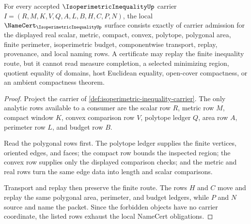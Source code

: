 \begin{theorem}
\label{thm:isoperimetric-inequality-namecert-obligations}
For every accepted $\IsoperimetricInequalityUp$ carrier $I=(R,M,K,V,Q,A,L,B,H,C,P,N)$, the local $\NameCert_{\IsoperimetricInequalityUp}$ surface consists exactly of carrier admission for the displayed real scalar, metric, compact, convex, polytope, polygonal area, finite perimeter, isoperimetric budget, componentwise transport, replay, provenance, and local naming rows. A certificate may replay the finite inequality route, but it cannot read measure completion, a selected minimizing region, quotient equality of domains, host Euclidean equality, open-cover compactness, or an ambient compactness theorem.
\end{theorem}
\begin{proof}
Project the carrier of \autoref{def:isoperimetric-inequality-carrier}. The only analytic rows available to a consumer are the scalar row $R$, metric row $M$, compact window $K$, convex comparison row $V$, polytope ledger $Q$, area row $A$, perimeter row $L$, and budget row $B$.

Read the polygonal rows first. The polytope ledger supplies the finite vertices, oriented edges, and faces; the compact row bounds the inspected region; the convex row supplies only the displayed comparison checks; and the metric and real rows turn the same edge data into length and scalar comparisons.

Transport and replay then preserve the finite route. The rows $H$ and $C$ move and replay the same polygonal area, perimeter, and budget ledgers, while $P$ and $N$ source and name the packet. Since the forbidden objects have no carrier coordinate, the listed rows exhaust the local NameCert obligations.
\end{proof}

